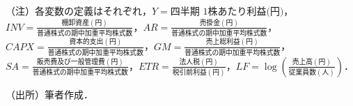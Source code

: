 \begin{threeparttable}
\begin{tablenotes}
    \item[]  （注）各変数の定義はそれぞれ，$Y = \text{四半期 1株あたり利益(円)}$，$INV = \frac{棚卸資産(円)}{普通株式の期中加重平均株式数}$，$AR = \frac{売掛金(円)}{普通株式の期中加重平均株式数}$，$CAPX = \frac{資本的支出(円)}{普通株式の期中加重平均株式数}$，$GM = \frac{売上総利益(円)}{普通株式の期中加重平均株式数}$，$SA = \frac{販売費及び一般管理費(円)}{普通株式の期中加重平均株式数}$，$ETR = \frac{法人税(円)}{税引前利益(円)}$，$LF = \log{\left(\frac{売上高(円)}{従業員数(人)}\right)}$．
    \item[]（出所）筆者作成．
\end{tablenotes}
\end{threeparttable}  